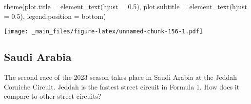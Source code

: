 \documentclass[
]{book}
\newenvironment{Shaded}{\begin{snugshade}}{\end{snugshade}}
\newcommand{\AttributeTok}[1]{\textcolor[rgb]{0.77,0.63,0.00}{#1}}
\newcommand{\FloatTok}[1]{\textcolor[rgb]{0.00,0.00,0.81}{#1}}
\newcommand{\FunctionTok}[1]{\textcolor[rgb]{0.00,0.00,0.00}{#1}}
\newcommand{\NormalTok}[1]{#1}
\newcommand{\StringTok}[1]{\textcolor[rgb]{0.31,0.60,0.02}{#1}}
\begin{document}
\begin{Shaded}
\begin{Highlighting}[]
  \FunctionTok{theme}\NormalTok{(}\AttributeTok{plot.title =} \FunctionTok{element\_text}\NormalTok{(}\AttributeTok{hjust =} \FloatTok{0.5}\NormalTok{),}
        \AttributeTok{plot.subtitle =} \FunctionTok{element\_text}\NormalTok{(}\AttributeTok{hjust =} \FloatTok{0.5}\NormalTok{),}
        \AttributeTok{legend.position =} \StringTok{\textquotesingle{}bottom\textquotesingle{}}\NormalTok{)}
\end{Highlighting}
\end{Shaded}

\texttt{[image: \_main\_files/figure-latex/unnamed-chunk-156-1.pdf]}

\hypertarget{saudi-arabia}{%
\subsection{Saudi Arabia}\label{saudi-arabia}}

The second race of the 2023 season takes place in Saudi Arabia at the Jeddah Corniche Circuit. Jeddah is the fastest street circuit in Formula 1. How does it compare to other street circuits?
\end{document}
